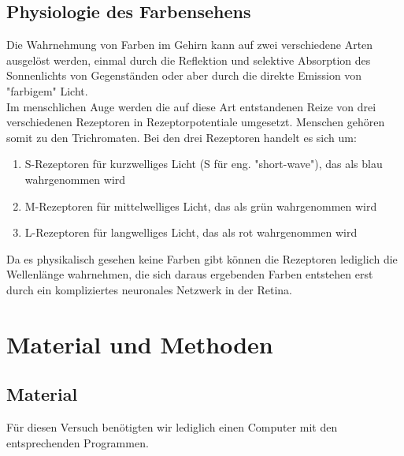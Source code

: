 \documentclass[11pt]{article}
\begin{document}
\subsection{Physiologie des Farbensehens}
Die Wahrnehmung von Farben im Gehirn kann auf zwei verschiedene Arten ausgelöst werden, einmal durch die Reflektion und selektive Absorption des Sonnenlichts von Gegenständen  oder aber durch die direkte Emission von "{}farbigem"{} Licht. \\
Im menschlichen Auge werden die auf diese Art entstandenen Reize von drei verschiedenen Rezeptoren in Rezeptorpotentiale umgesetzt. Menschen gehören somit zu den Trichromaten. Bei den drei Rezeptoren handelt es sich um: 
\begin{enumerate}
\item S-Rezeptoren für kurzwelliges Licht (S für eng. "{}short-wave"{}), das als blau wahrgenommen wird
\item M-Rezeptoren für mittelwelliges Licht, das als grün wahrgenommen wird
\item L-Rezeptoren für langwelliges Licht, das als rot wahrgenommen wird
\end{enumerate}
Da es physikalisch gesehen keine Farben gibt können die Rezeptoren lediglich die Wellenlänge wahrnehmen, die sich daraus ergebenden Farben entstehen erst durch ein kompliziertes neuronales Netzwerk in der Retina. 

\section{Material und Methoden}
\subsection{Material}
Für diesen Versuch benötigten wir lediglich einen Computer mit den entsprechenden Programmen.
\end{document}

